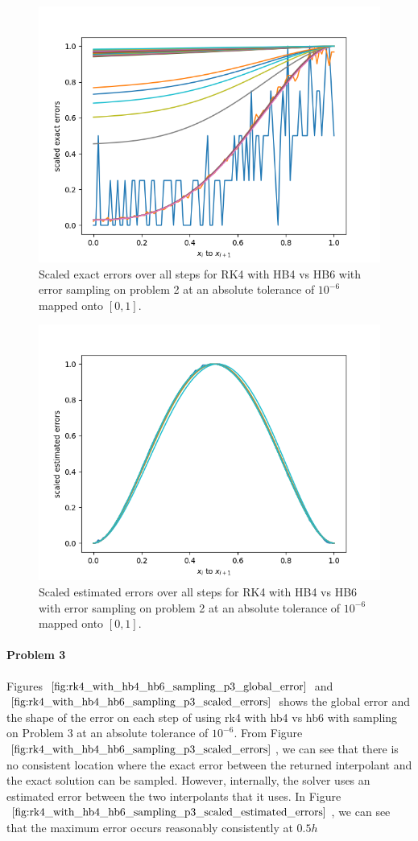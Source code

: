 \begin{figure}[H]
\centering
\includegraphics[width=0.7\linewidth]{./figures/rk4_with_hb4_hb6_sampling_p2_scaled_errors}
\caption{Scaled exact errors over all steps for RK4 with HB4 vs HB6 with error sampling on problem 2 at an absolute tolerance of $10^{-6}$ mapped onto $[0, 1]$.}
\label{fig:rk4_with_hb4_hb6_sampling_p2_scaled_errors}
\end{figure}

\begin{figure}[H]
\centering
\includegraphics[width=0.7\linewidth]{./figures/rk4_with_hb4_hb6_sampling_p2_scaled_estimated_errors}
\caption{Scaled estimated errors over all steps for RK4 with HB4 vs HB6 with error sampling on problem 2 at an absolute tolerance of $10^{-6}$ mapped onto $[0, 1]$.}
\label{fig:rk4_with_hb4_hb6_sampling_p2_scaled_estimated_errors}
\end{figure}


\paragraph{Problem 3} Figures $\ref{fig:rk4_with_hb4_hb6_sampling_p3_global_error}$ and $\ref{fig:rk4_with_hb4_hb6_sampling_p3_scaled_errors}$ shows the global error and the shape of the error on each step of using rk4 with hb4 vs hb6 with sampling on Problem 3 at an absolute tolerance of $10^{-6}$. From Figure $\ref{fig:rk4_with_hb4_hb6_sampling_p3_scaled_errors}$, we can see that there is no consistent location where the exact error between the returned interpolant and the exact solution can be sampled. However, internally, the solver uses an estimated error between the two interpolants that it uses. In Figure $\ref{fig:rk4_with_hb4_hb6_sampling_p3_scaled_estimated_errors}$, we can see that the maximum error occurs reasonably consistently at $0.5h$

